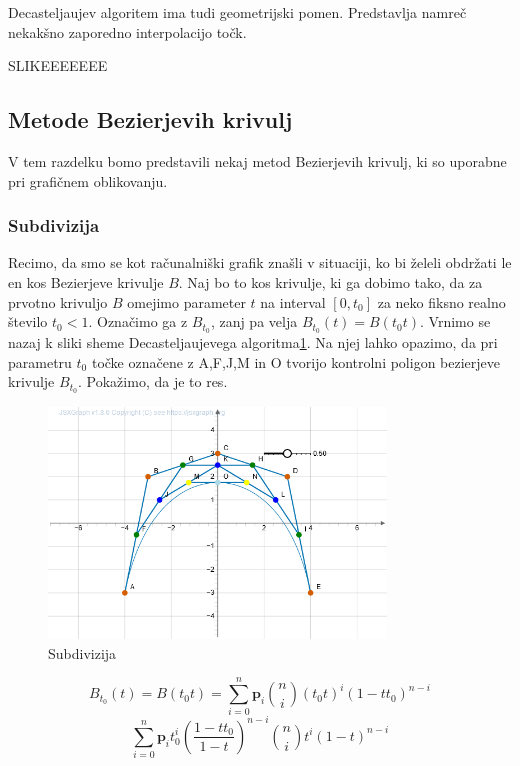 \documentclass[isrm2, tisk]{fmfdelo}
\begin{document}
    Decasteljaujev algoritem ima tudi geometrijski pomen.
    Predstavlja namreč nekakšno zaporedno interpolacijo točk.

    SLIKEEEEEEE

    \subsection{Metode Bezierjevih krivulj}
    V tem razdelku bomo predstavili nekaj metod Bezierjevih krivulj, ki so uporabne pri grafičnem oblikovanju.

    \subsubsection{Subdivizija}
    Recimo, da smo se kot računalniški grafik znašli v situaciji, ko bi želeli obdržati le en kos Bezierjeve krivulje $B$.
    Naj bo to kos krivulje, ki ga dobimo tako, da za prvotno krivuljo $B$ omejimo parameter $t$ na interval $[0,t_0]$ za neko fiksno realno število $t_0<1$.
    Označimo ga z $B_{t_0}$, zanj pa velja $B_{t_0}(t)=B(t_{0}t)$.
    Vrnimo se nazaj k sliki sheme Decasteljaujevega algoritma\ref{fig:subdivizija}.
    Na njej lahko opazimo, da pri parametru $t_0$ točke označene z A,F,J,M in O tvorijo kontrolni poligon bezierjeve krivulje $B_{t_0}$.
    Pokažimo, da je to res.

    \begin{figure}[h!]
        \centering
        \includegraphics[width=0.8\textwidth]{images/subidivizja.png}
        \caption{Subdivizija}
        \label{fig:subdivizija}
    \end{figure}

    \[B_{t_0}(t) = B(t_{0}t) = \sum_{i=0}^{n}\mathbf{p}_{i}\binom{n}{i}(t_{0}t)^i(1-tt_0)^{n-i} \]
    \[ \sum_{i=0}^{n}\mathbf{p}_{i}t_0^{i}\left(\frac{1-tt_0}{1-t}\right)^{n-i}\binom{n}{i}t^i(1-t)^{n-i} \]
\end{document}
